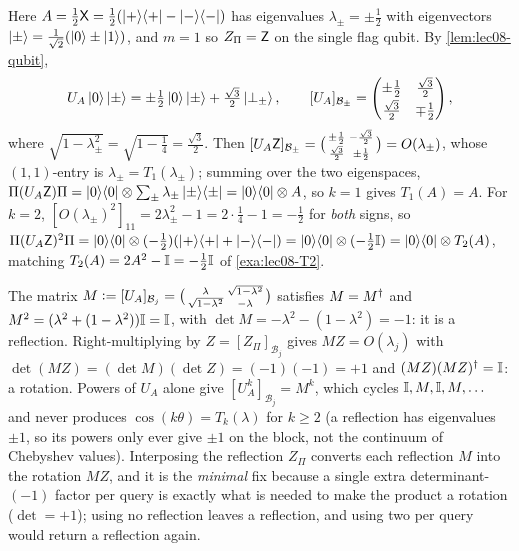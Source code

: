 \begin{solution}
Here $A=\tfrac12\mathsf{X}=\tfrac12(\ket{+}\!\bra{+}-\ket{-}\!\bra{-})$ has eigenvalues
$\lambda_\pm=\pm\tfrac12$ with eigenvectors $\ket\pm=\tfrac1{\sqrt2}(\ket0\pm\ket1)$,
and $m=1$ so $Z_\Pi=\mathsf{Z}$ on the single flag qubit. By \cref{lem:lec08-qubit},
\[
  U_A\ket0\ket\pm=\pm\tfrac12\ket0\ket\pm+\tfrac{\sqrt3}{2}\ket{\perp_\pm},
  \qquad
  [U_A]_{\mathcal B_\pm}
  =\begin{pmatrix}\pm\tfrac12&\tfrac{\sqrt3}{2}\\[2pt]\tfrac{\sqrt3}{2}&\mp\tfrac12\end{pmatrix},
\]
where $\sqrt{1-\lambda_\pm^2}=\sqrt{1-\tfrac14}=\tfrac{\sqrt3}{2}$. Then
$[U_A\mathsf{Z}]_{\mathcal B_\pm}=\bigl(\begin{smallmatrix}\pm\frac12&-\frac{\sqrt3}2\\
\frac{\sqrt3}2&\pm\frac12\end{smallmatrix}\bigr)=O(\lambda_\pm)$, whose $(1,1)$-entry
is $\lambda_\pm=T_1(\lambda_\pm)$; summing over the two eigenspaces,
$\Pi(U_A\mathsf{Z})\Pi=\ket{0}\!\bra{0}\otimes\sum_\pm\lambda_\pm\ket{\pm}\!\bra{\pm}=\ket{0}\!\bra{0}\otimes A$, so
$k=1$ gives $T_1(A)=A$. For $k=2$, $[O(\lambda_\pm)^2]_{11}=2\lambda_\pm^2-1
=2\cdot\tfrac14-1=-\tfrac12$ for \emph{both} signs, so
$\Pi(U_A\mathsf{Z})^2\Pi=\ket{0}\!\bra{0}\otimes(-\tfrac12)(\ket{+}\!\bra{+}+\ket{-}\!\bra{-})
=\ket{0}\!\bra{0}\otimes(-\tfrac12\mathbb{I})=\ket{0}\!\bra{0}\otimes T_2(A)$, matching
$T_2(A)=2A^2-\mathbb{I}=-\tfrac12\mathbb{I}$ of \cref{exa:lec08-T2}.
\end{solution}

\begin{solution}
The matrix $M\vcentcolon=[U_A]_{\mathcal B_j}=\bigl(\begin{smallmatrix}\lambda&\sqrt{1-\lambda^2}
\\ \sqrt{1-\lambda^2}&-\lambda\end{smallmatrix}\bigr)$ satisfies $M=M^{\dagger}$ and
$M^2=(\lambda^2+(1-\lambda^2))\mathbb{I}=\mathbb{I}$, with $\det M=-\lambda^2-(1-\lambda^2)=-1$: it
is a reflection. Right-multiplying by $Z=[Z_\Pi]_{\mathcal B_j}$ gives
$MZ=O(\lambda_j)$ with $\det(MZ)=(\det M)(\det Z)=(-1)(-1)=+1$ and $(MZ)(MZ)^{\dagger}=\mathbb{I}$:
a rotation. Powers of $U_A$ alone give $[U_A^k]_{\mathcal B_j}=M^k$, which cycles
$\mathbb{I},M,\mathbb{I},M,\dots$ and never produces $\cos(k\theta)=T_k(\lambda)$ for $k\ge2$ (a
reflection has eigenvalues $\pm1$, so its powers only ever give $\pm1$ on the block,
not the continuum of Chebyshev values). Interposing the reflection $Z_\Pi$ converts
each reflection $M$ into the rotation $MZ$, and it is the \emph{minimal} fix because
a single extra determinant-$(-1)$ factor per query is exactly what is needed to make
the product a rotation ($\det=+1$); using no reflection leaves a reflection, and
using two per query would return a reflection again.
\end{solution}

